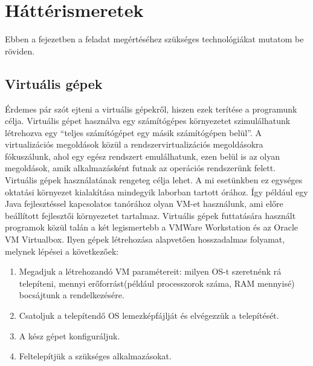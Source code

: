 \chapter{Háttérismeretek}
\label{chp:background}
Ebben a fejezetben a feladat megértéséhez szükséges technológiákat mutatom be röviden.

\section{Virtuális gépek}
Érdemes pár szót ejteni a virtuális gépekről, hiszen ezek terítése a programunk célja. Virtuális gépet használva egy számítógépes környezetet szimulálhatunk létrehozva egy ``teljes számítógépet egy másik számítógépen belül''. A virtualizációs megoldások közül a rendszervirtualizációs megoldásokra fókuszálunk, ahol egy egész rendszert emulálhatunk, ezen belül is az olyan megoldások, amik alkalmazásként futnak az operációs rendszerünk felett. Virtuális  gépek használatának rengeteg célja lehet. A mi esetünkben ez egységes oktatási környezet kialakítása mindegyik laborban tartott órához. Így például egy Java fejlesztéssel kapcsolatos tanórához olyan VM-et használunk, ami előre beállított fejlesztői környezetet tartalmaz.
Virtuális gépek futtatására használt programok közül talán a két legismertebb a VMWare Workstation\cite{vmware} és az Oracle VM Virtualbox\cite{virtualbox}. Ilyen gépek létrehozása alapvetően hosszadalmas folyamat, melynek lépései a következőek:

\begin{enumerate}
  \item Megadjuk a létrehozandó VM paramétereit: milyen OS-t szeretnénk rá telepíteni, mennyi erőforrást(például processzorok száma, RAM mennyisé) bocsájtunk a rendelkezésére.
  \item	Csatoljuk a telepítendő OS lemezképfájlját és elvégezzük a telepítését.
  \item A kész gépet konfiguráljuk.
  \item Feltelepítjük a szükséges alkalmazásokat.
\end{enumerate}

